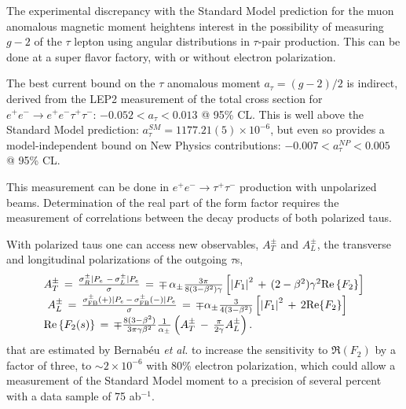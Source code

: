 
The experimental discrepancy with the Standard Model prediction for
the muon anomalous magnetic moment heightens interest in the
possibility of measuring $g-2$ of the $\tau$ lepton using angular
distributions in $\tau$-pair production. This can be done at a super flavor factory, with or without electron polarization.  

The best current bound on the $\tau$ anomalous moment  $a_{\tau}=(g-2)/2$ is indirect, derived from the LEP2 measurement of the total cross section for $e^+e^- \rightarrow e^+e^- \tau^+\tau^-$: $-0.052 < a_\tau < 0.013$ @ 95\% CL. This is well above the Standard Model prediction: $a_\tau^{SM} = 1177.21(5) \times 10^{-6}$, but even so provides a model-independent bound on New Physics contributions:  $-0.007 < a_\tau^{NP} < 0.005$ @ 95\% CL.~\cite{ref:bern2}

This measurement can be done in $e^+ e^- \rightarrow \tau^+\tau^-$ production with unpolarized beams. Determination of the real part of the form factor requires the measurement of correlations between the decay products of both polarized taus. 

With polarized taus one can access new observables, $A_T^\pm$ and $A_L^\pm$, the transverse and longitudinal polarizations of the outgoing $\tau$s,
\[\begin{array}{l}
A_T^ \pm \, = \,\frac{{\sigma _R^ \pm |{P_e}\,\, - \,\sigma _L^ \pm |{P_e}}}{\sigma }\, = \, \mp \,{\alpha _ \pm }\frac{{3\pi }}{{8(3 - {\beta ^2})\gamma }}\left[ {{{\left| {{F_1}} \right|}^2}\, + \,(2 - {\beta ^2}){\gamma ^2}{\mathop{\rm Re}\nolimits} \left\{ {{F_2}} \right\}} \right]\\
\,\,A_L^ \pm \, = \,\frac{{\sigma _{{\rm{FB}}}^ \pm ( + )|{P_e}\, - \,\sigma _{{\rm{FB}}}^ \pm ( - )|{P_e}}}{\sigma }\, = \, \mp {\alpha _ \pm }\frac{3}{{4(3 - {\beta ^2})}}\left[ {{{\left| {{F_1}} \right|}^2}\, + \,2{\mathop{\rm Re}\nolimits} \{ {F_2}\} } \right]\\
{\rm{                  Re}}\left\{ {{F_2}(s)} \right\}\, = \, \mp \frac{{8(3 - {\beta ^2})}}{{3\pi \gamma {\beta ^2}}}\frac{1}{{{\alpha _ \pm }}}\left( {A_T^ \pm \, - \,\frac{\pi }{{2\gamma }}A_L^ \pm } \right).
\end{array}\]
that are estimated by
Bernab\'eu {\it et al.}\cite{ref:bern1} to increase the sensitivity to
$\Re(F_2)$ by a factor of three, to $\sim2\times 10^{-6}$ with 80\%
electron polarization, which could allow a measurement of the Standard
Model moment to a precision of several percent with a data sample of
75 ab$^{-1}$. 

